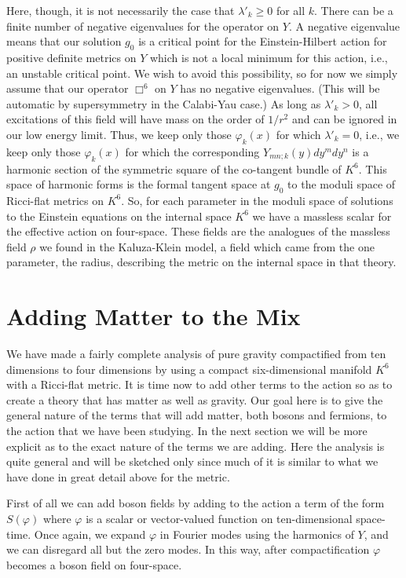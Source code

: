 Here, though, it is not necessarily the case that $\lambda'_k\ge 0$
for all 
$k$. There can be a finite number of negative eigenvalues for the
operator on $Y$. A negative eigenvalue means that our solution $g_0$
is a critical point for the Einstein-Hilbert action for positive
definite metrics on $Y$ which is not a local minimum for this action,
i.e., an unstable critical point.
We wish to avoid this possibility, so for now we simply assume that
our operator $\Box^6$ on $Y$ has no negative eigenvalues.
(This will be automatic by supersymmetry in the Calabi-Yau case.)
As long as $\lambda'_k>0$, all excitations of this field will have mass
on the order of $1/r^2$ and can be ignored in our low energy limit.
Thus, we keep only those $\varphi_k(x)$ for which $\lambda'_k=0$, i.e.,
we keep only those $\varphi_k(x)$ for which the corresponding
$Y_{mn;k}(y)dy^m dy^n$ is a harmonic section of the symmetric square
of the co-tangent bundle of $K^6$.  This space of harmonic forms is
the formal tangent space at $g_0$ to the moduli space of Ricci-flat
metrics on $K^6$.
So, for each parameter in the moduli space of solutions to the Einstein
equations on the internal space $K^6$ we have a massless scalar for
the effective action on four-space. 
These fields are the analogues of the massless field $\rho$ we found
in the Kaluza-Klein model, a field which came from the one parameter,
the radius, describing the metric on the internal space in that
theory. 


\section{Adding Matter to the Mix}

We have made a fairly complete analysis of pure gravity compactified
from ten dimensions to four dimensions by using a compact
six-dimensional manifold $K^6$ with a Ricci-flat metric. It is time
now to add other terms to the action so as to create a theory that has
matter as well as gravity.
Our goal here is to give the general nature of the terms that will add
matter, both bosons and fermions, to the action that we have been
studying. In the next section we will be more explicit as to the exact
nature of the terms we are adding. Here the analysis is quite general
and will be  sketched only since much of it is similar to
what we have done in great detail above for the metric.

First of all we can add boson fields by adding to the action a term of
the form $S(\varphi)$ where $\varphi$ is a scalar or vector-valued
function on ten-dimensional space-time.
Once again, we expand $\varphi$ in Fourier modes using the harmonics
of $Y$, and we can disregard all but the zero modes. In this way,
after compactification $\varphi$  becomes a boson field on four-space.

